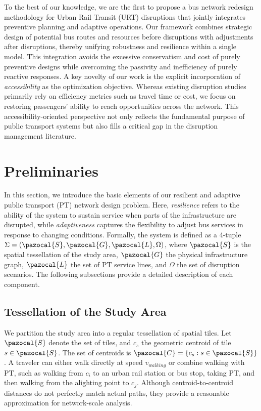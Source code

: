 \documentclass[3p,times,procedia]{elsarticle}
\begin{document}
To the best of our knowledge, we are the first to propose a bus network redesign methodology for Urban Rail Transit (URT) disruptions that jointly integrates preventive planning and adaptive operations. 
Our framework combines strategic design of potential bus routes and resources before disruptions with adjustments after disruptions, thereby unifying robustness and resilience within a single model. 
This integration avoids the excessive conservatism and cost of purely preventive designs while overcoming the passivity and inefficiency of purely reactive responses. 
A key novelty of our work is the explicit incorporation of \emph{accessibility} as the optimization objective. 
Whereas existing disruption studies primarily rely on efficiency metrics such as travel time or cost, 
we focus on restoring passengers’ ability to reach opportunities across the network. 
This accessibility-oriented perspective not only reflects the fundamental purpose of public transport systems but also fills a critical gap in the disruption management literature.


\section{Preliminaries}
In this section, we introduce the basic elements of our resilient and adaptive public transport (PT) network design problem. 
Here, \emph{resilience} refers to the ability of the system to sustain service when parts of the infrastructure are disrupted, while \emph{adaptiveness} captures the flexibility to adjust bus services in response to changing conditions. 
%
Formally, the system is defined as a 4-tuple 
$\Sigma = (\pazocal{S}, \pazocal{G}, \pazocal{L}, \Omega)$,
where $\pazocal{S}$ is the spatial tessellation of the study area, $\pazocal{G}$ the physical infrastructure graph, $\pazocal{L}$ the set of PT service lines, and $\Omega$ the set of disruption scenarios. 
%
The following subsections provide a detailed description of each component.

\subsection{Tessellation of the Study Area}
We partition the study area into a regular tessellation of spatial tiles. Let $\pazocal{S}$ denote the set of tiles, and $c_s$ the geometric centroid of tile $s \in \pazocal{S}$. The set of centroids is $\pazocal{C} = \{c_s : s \in \pazocal{S}\}$. 
%
A traveler can either walk directly at speed $v_{walking}$ or combine walking with PT, such as walking from $c_i$ to an urban rail station or bus stop, taking PT, and then walking from the alighting point to $c_j$. Although centroid-to-centroid distances do not perfectly match actual paths, they provide a reasonable approximation for network-scale analysis.
\end{document}
